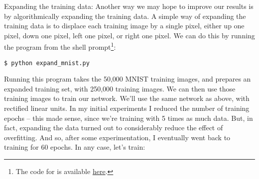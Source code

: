 \documentclass[a4paper,twoside,10pt]{book}
\begin{document}
Expanding the training data: Another way we may hope to improve our results is by algorithmically expanding the training data. A simple way of expanding the training data is to displace each training image by a single pixel, either up one pixel, down one pixel, left one pixel, or right one pixel. We can do this by running the program  from the shell prompt\footnote{The code for  is available \href{https://github.com/mnielsen/neural-networks-and-deep-learning/blob/master/src/expand_mnist.py}{here}.}:
\begin{lstlisting}
$ python expand_mnist.py
\end{lstlisting}
Running this program takes the 50,000 MNIST training images, and prepares an expanded training set, with 250,000 training images. We can then use those training images to train our network. We'll use the same network as above, with rectified linear units. In my initial experiments I reduced the number of training epochs -- this made sense, since we're training with 5 times as much data. But, in fact, expanding the data turned out to considerably reduce the effect of overfitting. And so, after some experimentation, I eventually went back to training for 60 epochs. In any case, let's train:
\end{document}
